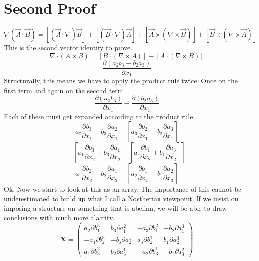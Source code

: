 \documentclass[12pt]{article}
\begin{document}
\section{Second Proof}
\begin{equation}
\nabla (\vec{A} \cdot \vec{B}) = [(\vec{A} \cdot \nabla)\vec{B}]+[(\vec{B} \cdot \nabla)\vec{A}] + [\vec{A} \times (\nabla \times \vec{B})]+ [\vec{B} \times (\nabla \times \vec{A})]
\end{equation}
This is the second vector identity to prove.
\begin{equation}
\nabla \cdot (A \times B)  = [B \cdot (\nabla \times A)] - [A \cdot (\nabla \times B)]
\end{equation}
\begin{equation}
\frac{\partial (a_2 b_3-b_2 a_3) }{\partial x_1}
\end{equation}
Structurally, this means we have to apply the product rule twice: 
Once on the first term and again on the second term.
\begin{equation}
\frac{\partial (a_2 b_3)}{\partial x_1} -\frac{\partial (b_2 a_3) }{\partial x_1}
\end{equation}
Each of these must get expanded according to the product rule.
\begin{equation}
 a_2\frac{\partial b_3}{\partial x_1} +  b_3\frac{\partial a_2}{\partial x_1} - \left[ a_3\frac{\partial b_2}{\partial x_1} +  b_2\frac{\partial a_3}{\partial x_1} \right]
\end{equation}
\begin{equation}
- \left[ a_1\frac{\partial b_3}{\partial x_2} +  b_3\frac{\partial a_1}{\partial x_2} - \left[ a_3\frac{\partial b_1}{\partial x_2} +  b_1\frac{\partial a_3}{\partial x_2} \right]\right]
\end{equation}
\begin{equation}
 a_1\frac{\partial b_2}{\partial x_3} +  b_2\frac{\partial a_1}{\partial x_3} 
- \left[ a_2\frac{\partial b_1}{\partial x_3} +  b_1\frac{\partial a_2}{\partial x_3} \right]
\end{equation}
Ok. Now we start to look at this as an array. The importance of this cannot be underestimated to build up what I call a Noetherian viewpoint. If we insist on imposing a structure on something that is abelian, we will be able to draw conclusions with much more alacrity.
\begin{equation}
\mathbf{X} = \left(
\begin{array}{cccc}
a_2\partial b^3_1 & b_3\partial a^2_1  & -a_3\partial b^2_1 & -b_2\partial a^3_1 \\
-a_1\partial b^3_2 & -b_3\partial a^1_2  & a_3\partial b^1_2 & b_1\partial a^3_2 \\
a_1\partial b^2_3 & b_2\partial a^1_3  & -a_2\partial b^1_3 & -b_1\partial a^2_3 
\end{array} \right)
\end{equation}
\end{document}
